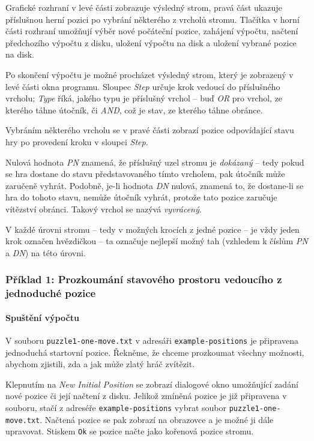\documentclass{article}
\begin{document}
Grafické rozhraní v levé části zobrazuje výsledný strom, pravá část ukazuje příslušnou herní pozici po vybrání některého
z vrcholů stromu. Tlačítka v horní části rozhraní umožňují výběr nové počáteční pozice, zahájení výpočtu, načtení
předchozího výpočtu z disku, uložení výpočtu na disk a uložení vybrané pozice na disk.

Po skončení výpočtu je možné procházet výsledný strom, který je zobrazený v levé části okna programu. Sloupec
\emph{Step} určuje krok vedoucí do příslušného vrcholu; \emph{Type} říká, jakého typu je příslušný vrchol -- buď
\emph{OR} pro vrchol, ze kterého táhne útočník, či \emph{AND}, což je stav, ze kterého táhne obránce.

Vybráním některého vrcholu se v pravé části zobrazí pozice odpovídající stavu hry po provedení kroku v sloupci
\emph{Step}.

Nulová hodnota \emph{PN} znamená, že příslušný uzel stromu je \emph{dokázaný} -- tedy pokud se hra dostane do stavu
představovaného tímto vrcholem, pak útočník může zaručeně vyhrát. Podobně, je-li hodnota \emph{DN} nulová,
znamená to, že dostane-li se hra do tohoto stavu, nemůže útočník vyhrát, protože tato pozice zaručuje vítězství
obránci. Takový vrchol se nazývá \emph{vyvrácený}.

V každé úrovni stromu -- tedy v možných krocích z jedné pozice -- je vždy jeden krok označen hvězdičkou -- ta označuje nejlepší
možný tah (vzhledem k číslům \emph{PN} a \emph{DN}) na této úrovni.

\subsubsection{Příklad 1: Prozkoumání stavového prostoru vedoucího z jednoduché pozice}
\paragraph{Spuštění výpočtu}
V souboru \texttt{puzzle1-one-move.txt} v adresáři \texttt{example-positions} je připravena jednoduchá startovní pozice.
Řekněme, že chceme prozkoumat všechny možnosti, abychom zjistili, zda a jak může zlatý hráč zvítězit.

Klepnutím na \emph{New Initial Position} se zobrazí dialogové okno umožňující zadání nové pozice či její načtení z
disku. Jelikož zmíněná pozice je již připravena v souboru, stačí z adreséře \texttt{example-positions} vybrat soubor
\texttt{puzzle1-{}one-{}move.txt}. Načtená pozice se pak zobrazí na obrazovce a je možné ji dále upravovat. Stiskem
\texttt{Ok} se pozice načte jako kořenová pozice stromu.
\end{document}
